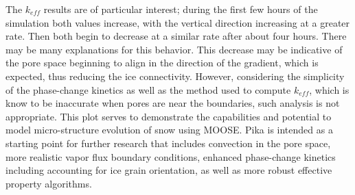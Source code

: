 The $k_{eff}$ results are of particular interest; during the first few hours of the simulation both values increase, with the vertical direction increasing at a greater rate. Then both begin to decrease at a similar rate after about four hours. There may be many explanations for this behavior. This decrease may be indicative of the pore space beginning to align in the direction of the gradient, which is expected, thus reducing the ice connectivity. However, considering the simplicity of the phase-change kinetics as well as the method used to compute $k_{eff}$, which is know to be inaccurate when pores are near the boundaries, such analysis is not appropriate. This plot serves to demonstrate the capabilities and potential to model micro-structure evolution of snow using MOOSE. Pika is intended as a starting point for further research that includes convection in the pore space, more realistic vapor flux boundary conditions, enhanced phase-change kinetics including accounting for ice grain orientation, as well as more robust effective property algorithms.


